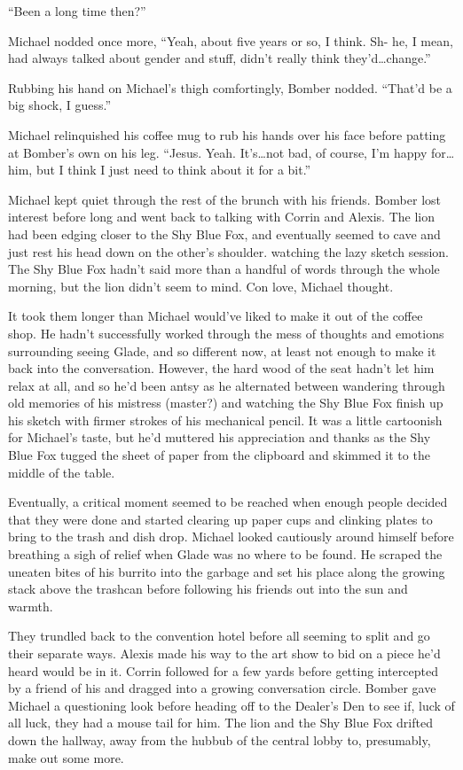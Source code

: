``Been a long time then?''

Michael nodded once more, ``Yeah, about five years or so, I think. Sh- he, I mean, had always talked about gender and stuff, didn't really think they'd\ldots{}change.''

Rubbing his hand on Michael's thigh comfortingly, Bomber nodded. ``That'd be a big shock, I guess.''

Michael relinquished his coffee mug to rub his hands over his face before patting at Bomber's own on his leg. ``Jesus. Yeah. It's\ldots{}not bad, of course, I'm happy for\ldots{}him, but I think I just need to think about it for a bit.''

Michael kept quiet through the rest of the brunch with his friends. Bomber lost interest before long and went back to talking with Corrin and Alexis. The lion had been edging closer to the Shy Blue Fox, and eventually seemed to cave and just rest his head down on the other's shoulder. watching the lazy sketch session. The Shy Blue Fox hadn't said more than a handful of words through the whole morning, but the lion didn't seem to mind. Con love, Michael thought.

It took them longer than Michael would've liked to make it out of the coffee shop. He hadn't successfully worked through the mess of thoughts and emotions surrounding seeing Glade, and so different now, at least not enough to make it back into the conversation. However, the hard wood of the seat hadn't let him relax at all, and so he'd been antsy as he alternated between wandering through old memories of his mistress (master?) and watching the Shy Blue Fox finish up his sketch with firmer strokes of his mechanical pencil. It was a little cartoonish for Michael's taste, but he'd muttered his appreciation and thanks as the Shy Blue Fox tugged the sheet of paper from the clipboard and skimmed it to the middle of the table.

Eventually, a critical moment seemed to be reached when enough people decided that they were done and started clearing up paper cups and clinking plates to bring to the trash and dish drop. Michael looked cautiously around himself before breathing a sigh of relief when Glade was no where to be found. He scraped the uneaten bites of his burrito into the garbage and set his place along the growing stack above the trashcan before following his friends out into the sun and warmth.

They trundled back to the convention hotel before all seeming to split and go their separate ways. Alexis made his way to the art show to bid on a piece he'd heard would be in it. Corrin followed for a few yards before getting intercepted by a friend of his and dragged into a growing conversation circle. Bomber gave Michael a questioning look before heading off to the Dealer's Den to see if, luck of all luck, they had a mouse tail for him. The lion and the Shy Blue Fox drifted down the hallway, away from the hubbub of the central lobby to, presumably, make out some more.

